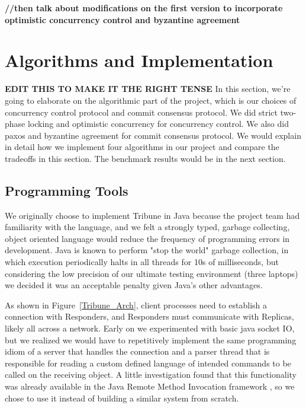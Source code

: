 \documentclass[10pt,twocolumn]{article}
\begin{document}

\textbf{//then talk about modifications on the first version to incorporate optimistic concurrency control and byzantine agreement}


\section{Algorithms and Implementation}

\textbf{EDIT THIS TO MAKE IT THE RIGHT TENSE}
In this section, we're going to elaborate on the algorithmic part of the project, which is our choices of concurrency control protocol and commit consensus protocol. We did strict two-phase locking and optimistic concurrency for concurrency control. We also did paxos and byzantine agreement for commit consensus protocol. We would explain in detail how we implement four algorithms in our project and compare the tradeoffs in this section. The benchmark results would be in the next section.

\subsection{Programming Tools}

We originally choose to implement Tribune in Java because the project team had familiarity with the language, and we felt a strongly typed, garbage collecting, object oriented language would reduce the frequency of programming errors in development. Java is known to perform "stop the world" garbage collection, in which execution periodically halts in all threads for 10s of milliseconds, but considering the low precision of our ultimate testing environment (three laptops) we decided it was an acceptable penalty given Java's other advantages.

As shown in Figure~\ref{Tribune_Arch}, client processes need to establish a connection with Responders, and Responders must communicate with Replicas, likely all across a network. Early on we experimented with basic java socket IO, but we realized we would have to repetitively implement the same programming idiom of a server that handles the connection and a parser thread that is responsible for reading a custom defined language of intended commands to be called on the receiving object. A little investigation found that this functionality was already available in the Java Remote Method Invocation framework \cite{Pitt:2001:JRM:558733},  so we chose to use it instead of building a similar system from scratch.
\end{document}
